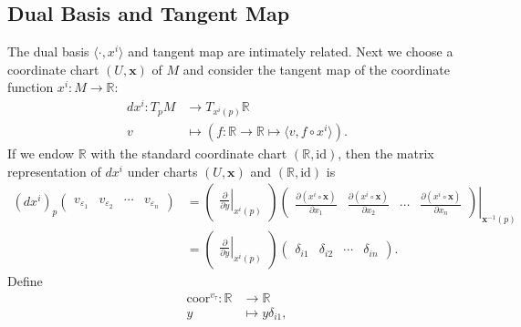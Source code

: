 \documentclass{report}
\begin{document}
\subsection{Dual Basis and Tangent Map}
The dual basis $\langle\cdot,{x}^i\rangle$ and tangent map are intimately related. 
Next we choose a coordinate chart $(U,\mathbf{x})$ of $M$ and consider the tangent map of the coordinate function ${x}^i: M\to \mathbb{R}$:
\[
    \begin{aligned}
        d{x}^i:T_pM&\longrightarrow T_{{x}^i(p)}\mathbb{R}\\
        v&\longmapsto \left(f:\mathbb{R}\to \mathbb{R} \longmapsto\langle v,f\circ {x}^i\rangle\right).
    \end{aligned}
\]
If we endow $\mathbb{R}$ with the standard coordinate chart $(\mathbb{R},\mathrm{id})$, then the matrix representation of $d{x}^i$ under charts $(U,\mathbf{x})$ and $(\mathbb{R},\mathrm{id})$ is
\[
    \begin{aligned}
    (d{x}^i)_p
    \begin{pmatrix}
    v_{\varepsilon_1}&v_{\varepsilon_2}&\cdots&v_{\varepsilon_n}
    \end{pmatrix}
    &=
    \begin{pmatrix}
        \left.\frac{\partial}{\partial y}\right|_{{x}^i(p)}
    \end{pmatrix}
    \left.\begin{pmatrix}
        \frac{\partial({x}^i\circ\mathbf{x})}{\partial
x_1}&\frac{\partial({x}^i\circ\mathbf{x})}{\partial
x_2}&\cdots&\frac{\partial({x}^i\circ\mathbf{x})}{\partial x_n}
    \end{pmatrix}\right|_{\mathbf{x}^{-1}(p)}\\
    &=\begin{pmatrix}
        \left.\frac{\partial}{\partial y}\right|_{{x}^i(p)}
    \end{pmatrix}
    \begin{pmatrix}
        \delta_{i1} &\delta_{i2}&\cdots&\delta_{in}
    \end{pmatrix}.
    \end{aligned}
    \]
Define
\[
    \begin{aligned}
        \mathrm{coor}^{v_{\tau}}:\mathbb{R}&\longrightarrow\mathbb{R}\\
        y&\longmapsto y\delta_{i1},
    \end{aligned}
\]

\end{document}
